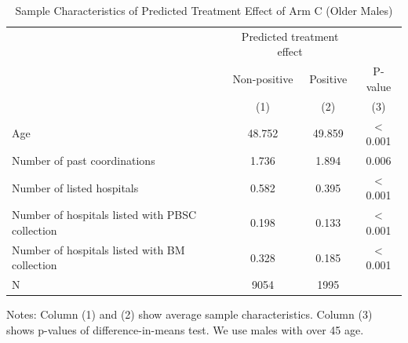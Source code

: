 \documentclass[
]{article}
\begin{document}
\begin{table}[H]

\caption{\label{tab:rcf-older-male}Sample Characteristics of Predicted Treatment Effect of Arm C (Older Males)}
\centering
\fontsize{9}{11}\selectfont
\fontsize{9}{11}\selectfont
\begin{threeparttable}
\begin{tabular}[t]{lccc}
\toprule
\multicolumn{1}{c}{ } & \multicolumn{2}{c}{Predicted treatment effect} & \multicolumn{1}{c}{ } \\
\cmidrule(l{3pt}r{3pt}){2-3}
\multicolumn{1}{c}{ } & \multicolumn{1}{c}{Non-positive} & \multicolumn{1}{c}{Positive} & \multicolumn{1}{c}{P-value} \\
\cmidrule(l{3pt}r{3pt}){2-2} \cmidrule(l{3pt}r{3pt}){3-3} \cmidrule(l{3pt}r{3pt}){4-4}
 & (1) & (2) & (3)\\
\midrule
Age & 48.752 & 49.859 & < 0.001\\
Number of past coordinations & 1.736 & 1.894 & 0.006\\
Number of listed hospitals & 0.582 & 0.395 & < 0.001\\
Number of hospitals listed with PBSC collection & 0.198 & 0.133 & < 0.001\\
Number of hospitals listed with BM collection & 0.328 & 0.185 & < 0.001\\
N & 9054 & 1995 & \\
\bottomrule
\end{tabular}
\begin{tablenotes}
\item Notes: Column (1) and (2) show average sample characteristics. Column (3) shows p-values of difference-in-means test. We use males with over 45 age.
\end{tablenotes}
\end{threeparttable}
\end{table}
\end{document}
